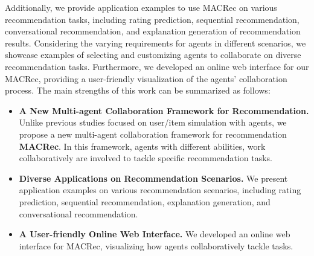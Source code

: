 Additionally, we provide application examples to use MACRec on various recommendation tasks, including rating prediction, sequential recommendation, conversational recommendation,
and explanation generation of recommendation results. 
Considering the varying requirements for agents in different scenarios, we showcase examples of selecting and customizing agents to collaborate on diverse recommendation tasks.
Furthermore, we developed an online web interface for our MACRec, providing a user-friendly visualization of the agents' collaboration process.
The main strengths of this work can be summarized as follows:
\begin{itemize}[leftmargin=*]
    \item \textbf{A New Multi-agent Collaboration Framework for Recommendation.}
    Unlike previous studies focused on user/item simulation with agents, we propose a new multi-agent collaboration framework for recommendation \textbf{MACRec}. In this framework, agents with different abilities, work collaboratively are involved to tackle specific recommendation tasks.
    
    
    \item \textbf{Diverse Applications on Recommendation Scenarios.}
    We present application examples on various recommendation scenarios, including rating prediction, sequential recommendation, explanation generation,
    and conversational recommendation.

    \item \textbf{A User-friendly Online Web Interface. } We developed an online web interface for MACRec, visualizing how agents collaboratively tackle tasks.

\end{itemize}


